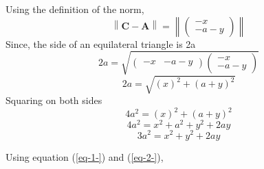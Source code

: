 \documentclass[journal,12pt,twocolumn]{IEEEtran}
\providecommand{\norm}[1]{\left\lVert#1\right\rVert}
\let\vec\mathbf
\newcommand{\myvec}[1]{\ensuremath{\begin{pmatrix}#1\end{pmatrix}}}
\begin{document}
\noindent Using the definition   of the norm, 
		\begin{equation}
\norm{\vec{C}-\vec{A}} =\norm{\myvec{-x \\ -a-y}}
\end{equation}
\noindent Since, the side of an equilateral triangle is 2a	
\begin{equation}						
			2a=\sqrt{\myvec{-x & -a-y}\myvec{-x \\ -a-y}} 
\end{equation}
\begin{equation}						
2a =  \sqrt{(x)^2+ (a+y)^2}
\end{equation}
\noindent Squaring on both sides
\begin{equation}						
4a^2 =  {(x)^2+ (a+y)^2}
\end{equation}
\begin{equation}
4a^2 = {x^2 + a^2 +y^2+2ay}
\end{equation}
\begin{equation}
3a^2 = {x^2+y^2+2ay}
\label{eq-2-}
\end{equation}


Using equation (\ref{eq-1-}) and (\ref{eq-2-}),
\end{document}
